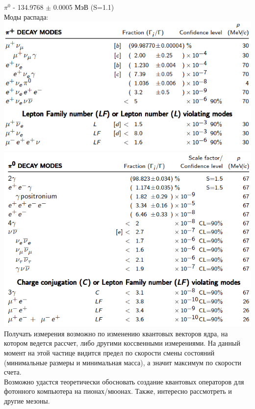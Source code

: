 \documentclass[11pt]{report}
\begin{document}
 $\pi^0 $ - 134.9768 $\pm$ 0.0005 МэВ (S=1.1)\\
 
Моды распада: \\

\includegraphics[scale=0.5]{decay_pp} \\

\includegraphics[scale=0.5]{decay_p0} \\

Получать измерения возможно по изменению квантовых векторов ядра, на котором ведется рассчет, либо другими коссвенными измерениями. На данный момент на этой частице видится предел по скорости смены состояний (минимальные размеры и минимальная масса), а значит максимум по скорости счета.\\

Возможно удастся теоретически обосновать создание квантовых операторов для фотонного компьютера на пионах/мюонах. Также, интересно рассмотреть и другие мезоны. \\
\end{document}
